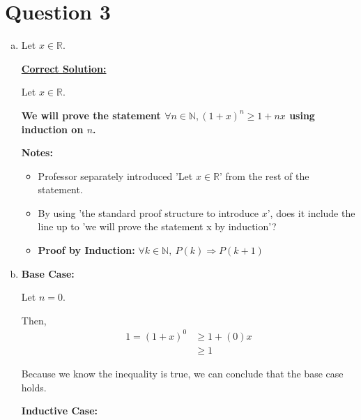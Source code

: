 \documentclass[12pt]{article}
\begin{document}
\section*{Question 3}
\begin{enumerate}[a.]
    \item
    Let $x \in \mathbb{R}$.

    \begin{mdframed}
        \underline{\textbf{Correct Solution:}}

        \bigskip

        Let $x \in \mathbb{R}$.

        \bigskip

        \color{red}
        \textbf{We will prove the statement $\forall n \in \mathbb{N}, (1+x)^n \geq 1 + nx$
        using induction on $n$.}
        \color{black}

    \end{mdframed}

    \textbf{Notes:}
    \begin{itemize}
        \item Professor separately introduced 'Let $x \in \mathbb{R}$' from
        the rest of the statement.
        \item By using 'the standard proof structure to introduce $x$', does it
        include the line up to 'we will prove the statement x by induction'?
        \item \textbf{Proof by Induction:} $\forall k \in \mathbb{N},\:P(k) \Rightarrow P(k+1)$
    \end{itemize}

    \item

    \textbf{Base Case:}

    \bigskip

    Let $n = 0$.

    \bigskip

    Then,
    \setcounter{equation}{0}
    \begin{align}
        1 = (1+x)^0 &\geq 1 + (0)x\\
        &\geq 1
    \end{align}

    \bigskip

    Because we know the inequality is true, we can conclude that the base case holds.

    \bigskip

    \textbf{Inductive Case:}

    \bigskip


\end{enumerate}
\end{document}
